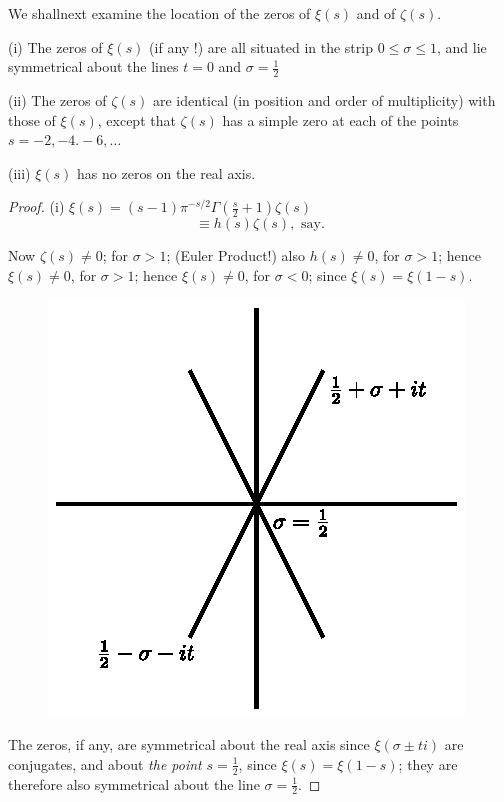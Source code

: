 We shall\pageoriginale next examine the location of the zeros of
$\xi(s)$ and of $\zeta(s)$.

\begin{thm}\cite[p.48]{key11}\label{chap13:thm2}
(i) The zeros of $\xi (s)$ (if any !) are all situated in the strip $0
\leq \sigma \leq 1$, and lie symmetrical about the lines $t=0$ and
$\sigma =\frac{1}{2}$

(ii) The zeros of $\zeta(s)$ are identical (in position and order of
multiplicity) with those of $\xi(s)$, except that $\zeta(s)$ has a
simple zero at each of the points $s=-2, -4. -6, \ldots$

(iii) $\xi(s)$ has no zeros on the real axis.
\end{thm}

\begin{proof}
(i) $\xi (s) = (s-1) \pi^{-s/2} \Gamma \left(\frac{s}{2}+1 \right)
  \zeta(s)$
$$
\equiv h(s) \zeta(s), \text{ say.}
$$

Now $\zeta(s) \neq 0$; for $\sigma >1$; (Euler Product!) also
$h(s) \neq 0$, for  $\sigma >1$;
hence $\xi (s) \neq 0$, for $\sigma > 1$;
hence $\xi (s) \neq 0$, for $\sigma < 0$; 
since $\xi(s) = \xi (1-s)$.

\begin{figure}[H]
\centering
\includegraphics{figures/fig13.1.eps}
\end{figure}

The zeros, if any, are symmetrical about the real axis since $\xi
(\sigma \pm t i)$ are conjugates, and about \textit{the point} $s =
\frac{1}{2}$, since $\xi (s) = \xi (1-s)$; they are therefore also
symmetrical about the line $\sigma = \frac{1}{2}$.


\end{proof}
